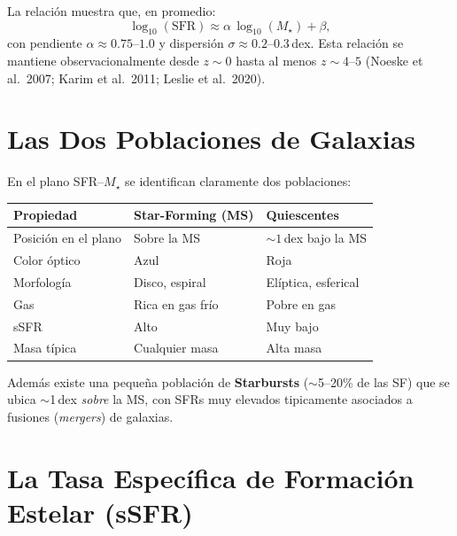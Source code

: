 \documentclass[12pt, a4paper]{article}
\begin{document}
La relación muestra que, en promedio:
\begin{equation}
    \log_{10}(\mathrm{SFR}) \approx \alpha\,\log_{10}(M_\star) + \beta,
    \label{eq:ms_lineal}
\end{equation}
con pendiente $\alpha \approx 0.75$--$1.0$ y dispersión $\sigma \approx 0.2$--$0.3$\,dex.
Esta relación se mantiene observacionalmente desde $z \sim 0$ hasta al menos $z \sim 4$--$5$
(Noeske et al.\ 2007; Karim et al.\ 2011; Leslie et al.\ 2020).

\section{Las Dos Poblaciones de Galaxias}

En el plano SFR--$M_\star$ se identifican claramente dos poblaciones:

\begin{center}
\begin{tabular}{p{4cm} p{4.5cm} p{4.5cm}}
\toprule
\textbf{Propiedad} & \textbf{Star-Forming (MS)} & \textbf{Quiescentes} \\
\midrule
Posición en el plano & Sobre la MS & $\sim 1$\,dex bajo la MS \\
Color óptico & Azul & Roja \\
Morfología & Disco, espiral & Elíptica, esferical \\
Gas & Rica en gas frío & Pobre en gas \\
sSFR & Alto & Muy bajo \\
Masa típica & Cualquier masa & Alta masa \\
\bottomrule
\end{tabular}
\end{center}

Además existe una pequeña población de \textbf{Starbursts} ($\sim$5--20\% de las SF)
que se ubica $\sim$1\,dex \textit{sobre} la MS, con SFRs muy elevados tipicamente
asociados a fusiones (\textit{mergers}) de galaxias.

\section{La Tasa Específica de Formación Estelar (sSFR)}
\end{document}
